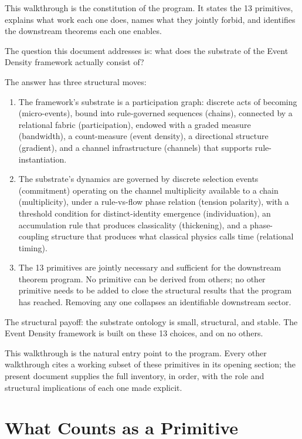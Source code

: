 \documentclass[11pt,a4paper]{article}
\begin{document}
This walkthrough is the constitution of the program. It states the 13 primitives, explains what work each one does, names what they jointly forbid, and identifies the downstream theorems each one enables.

The question this document addresses is: what does the substrate of the Event Density framework actually consist of?

The answer has three structural moves:

\begin{enumerate}[noitemsep]
\item The framework's substrate is a participation graph: discrete acts of becoming (micro-events), bound into rule-governed sequences (chains), connected by a relational fabric (participation), endowed with a graded measure (bandwidth), a count-measure (event density), a directional structure (gradient), and a channel infrastructure (channels) that supports rule-instantiation.
\item The substrate's dynamics are governed by discrete selection events (commitment) operating on the channel multiplicity available to a chain (multiplicity), under a rule-vs-flow phase relation (tension polarity), with a threshold condition for distinct-identity emergence (individuation), an accumulation rule that produces classicality (thickening), and a phase-coupling structure that produces what classical physics calls time (relational timing).
\item The 13 primitives are jointly necessary and sufficient for the downstream theorem program. No primitive can be derived from others; no other primitive needs to be added to close the structural results that the program has reached. Removing any one collapses an identifiable downstream sector.
\end{enumerate}

The structural payoff: the substrate ontology is small, structural, and stable. The Event Density framework is built on these 13 choices, and on no others.

This walkthrough is the natural entry point to the program. Every other walkthrough cites a working subset of these primitives in its opening section; the present document supplies the full inventory, in order, with the role and structural implications of each one made explicit.

\section{What Counts as a Primitive}
\end{document}
